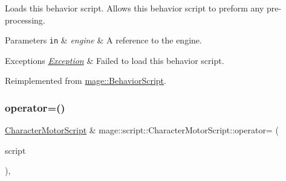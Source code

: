 Loads this behavior script. Allows this behavior script to preform any pre-\/processing.


\begin{DoxyParams}[1]{Parameters}
\mbox{\tt in}  & {\em engine} & A reference to the engine. \\
\hline
\end{DoxyParams}

\begin{DoxyExceptions}{Exceptions}
{\em \hyperlink{classmage_1_1_exception}{Exception}} & Failed to load this behavior script. \\
\hline
\end{DoxyExceptions}


Reimplemented from \hyperlink{classmage_1_1_behavior_script_ae7864876b2ffb1d1d8d8a56e3099f1f2}{mage\+::\+Behavior\+Script}.

\hypertarget{classmage_1_1script_1_1_character_motor_script_aec26db7e08e315cf2461e860b1eaee4e}{}\label{classmage_1_1script_1_1_character_motor_script_aec26db7e08e315cf2461e860b1eaee4e} 
\subsubsection{\texorpdfstring{operator=()}{operator=()}\hspace{0.1cm}{\footnotesize\ttfamily [1/2]}}
{\footnotesize\ttfamily \hyperlink{classmage_1_1script_1_1_character_motor_script}{Character\+Motor\+Script} \& mage\+::script\+::\+Character\+Motor\+Script\+::operator= (\begin{DoxyParamCaption}\item[{const \hyperlink{classmage_1_1script_1_1_character_motor_script}{Character\+Motor\+Script} \&}]{script }\end{DoxyParamCaption})\hspace{0.3cm}{\ttfamily [default]}, {\ttfamily [noexcept]}}

\hypertarget{classmage_1_1script_1_1_character_motor_script_a284b9ecfd595278062cf3a16ebd90f43}{}\label{classmage_1_1script_1_1_character_motor_script_a284b9ecfd595278062cf3a16ebd90f43} 
